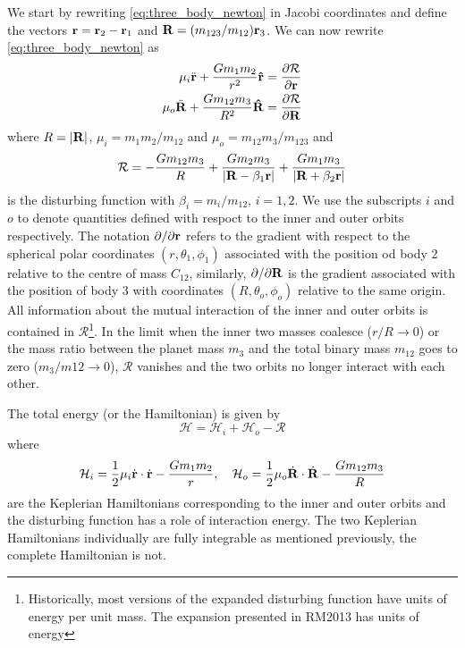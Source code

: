 \documentclass[ twoside,openright,titlepage,numbers=noenddot,headinclude,%
                footinclude=true,cleardoublepage=empty,abstractoff, %
                BCOR=5mm,paper=a4,fontsize=11pt,%
                american,%
                ]{scrreprt}
\begin{document}
We start by rewriting \cref{eq:three_body_newton} in Jacobi coordinates
and define the vectors $\boldsymbol{\mathbf{r}}=\boldsymbol{\mathbf{r}}_2-\boldsymbol{\mathbf{r}}_1$ and 
$\boldsymbol{\mathbf{R}}= (m_{123}/m_{12})\boldsymbol{\mathbf{r}}_3$.
We can now rewrite \cref{eq:three_body_newton} as
\begin{equation}
\begin{aligned}
    \mu_i\ddot{\boldsymbol{\mathbf{r}}}+ \frac{Gm_1m_2}{r^2} \boldsymbol{\mathbf{\hat r}}&= \frac{
        \partial \mathcal{R}}{\partial \boldsymbol{\mathbf{r}}} \\
    \mu_o\ddot{\boldsymbol{\mathbf{R}}}+ \frac{Gm_{12}m_3}{R^2} \boldsymbol{\mathbf{\hat R}}&= \frac{
        \partial \mathcal{R}}{\partial \boldsymbol{\mathbf{R}}} 
    \label{eq:three_body_newton_R}
\end{aligned}
\end{equation}
where $R=\lvert\boldsymbol{\mathbf{R}}\rvert$, $\mu_i=m_1m_2/m_{12}$ and $\mu_o=m_{12}m_3/m_{123}$
and
\begin{equation}
    \mathcal{R}=- \frac{Gm_{12}m_3}{R} + \frac{Gm_2m_3}{\lvert\boldsymbol{\mathbf{R}}-\beta_1\boldsymbol{\mathbf{r}}
    \rvert} + \frac{Gm_1m_3}{\lvert\boldsymbol{\mathbf{R}}+\beta_2\boldsymbol{\mathbf{r}}\rvert}
    \label{eq:dist_cartesian}
\end{equation}
is the disturbing function with $\beta_i=m_i/m_{12},\,i=1,2$. We use the subscripts
$i$ and $o$ to denote quantities defined with respoct to the inner and outer orbits
respectively. The notation $\partial/\partial\boldsymbol{\mathbf{r}}$ refers to the gradient with 
respect to the spherical polar coordinates $(r,\theta_1,\phi_1)$ 
associated with the position od body 2 relative to the centre of mass $C_{12}$, similarly,
$\partial/\partial\boldsymbol{\mathbf{R}}$ is the gradient associated with the position of body 3 with coordinates $(R,\theta_o,\phi_o)$
relative to the same origin. All information
about the mutual interaction of the inner and outer orbits is contained in
$\mathcal{R}$\footnote{Historically, most versions of the expanded disturbing
function have units of energy per unit mass. The expansion presented in RM2013 has
units of energy}. In the limit when the inner two masses coalesce ($r/R\rightarrow 0$)
or the mass ratio between the planet mass $m_3$ and the total binary mass $m_{12}$
goes to zero ($m_3/m{12}\rightarrow 0$), $\mathcal{R}$ vanishes and the two orbits
no longer interact with each other. 

The total energy (or the Hamiltonian) is given by
\begin{equation}
    \mathcal{H}=\mathcal{H}_i+\mathcal{H}_o-\mathcal{R}
    \label{eq:three_body_hamiltonian}
\end{equation}
where
\begin{equation}
    \mathcal{H}_i= \frac{1}{2}\mu_i\dot{\boldsymbol{\mathbf{r}}}\cdot\dot{\boldsymbol{\mathbf{r}}}- \frac{Gm_1m_2}{r}, \quad
    \mathcal{H}_o= \frac{1}{2}\mu_o\dot{\boldsymbol{\mathbf{R}}}\cdot\dot{\boldsymbol{\mathbf{R}}}- \frac{Gm_{12}m_3}{R}
\end{equation}
are the Keplerian Hamiltonians corresponding to the inner and outer orbits and the 
disturbing function has a role of interaction energy. The two Keplerian Hamiltonians
individually are fully integrable as mentioned previously, the complete Hamiltonian
is not. 
\end{document}
